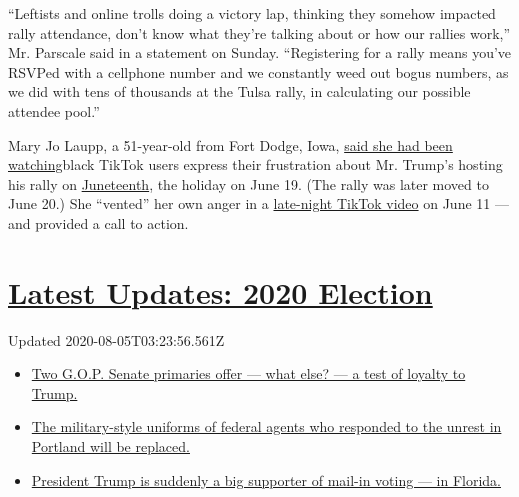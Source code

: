 ``Leftists and online trolls doing a victory lap, thinking they somehow
impacted rally attendance, don't know what they're talking about or how
our rallies work,'' Mr. Parscale said in a statement on Sunday.
``Registering for a rally means you've RSVPed with a cellphone number
and we constantly weed out bogus numbers, as we did with tens of
thousands at the Tulsa rally, in calculating our possible attendee
pool.''

Mary Jo Laupp, a 51-year-old from Fort Dodge, Iowa,
\href{https://www.dailydot.com/debug/tiktok-challenge-trump-rally/}{said
she had been watching}black TikTok users express their frustration about
Mr. Trump's hosting his rally on
\href{https://www.nytimes3xbfgragh.onion/interactive/2020/06/18/style/juneteenth-celebration.html}{Juneteenth},
the holiday on June 19. (The rally was later moved to June 20.) She
``vented'' her own anger in a
\href{https://www.tiktok.com/@maryjolaupp/video/6837311838640803078}{late-night
TikTok video} on June 11 --- and provided a call to action.

\hypertarget{latest-updates-2020-election}{%
\section{\texorpdfstring{\href{https://www.nytimes3xbfgragh.onion/2020/08/04/us/elections/primary-election-michigan-arizona-kansas.html?action=click\&pgtype=Article\&state=default\&region=MAIN_CONTENT_1\&context=storylines_live_updates}{Latest
Updates: 2020
Election}}{Latest Updates: 2020 Election}}\label{latest-updates-2020-election}}

Updated 2020-08-05T03:23:56.561Z

\begin{itemize}
\tightlist
\item
  \href{https://www.nytimes3xbfgragh.onion/2020/08/04/us/elections/primary-election-michigan-arizona-kansas.html?action=click\&pgtype=Article\&state=default\&region=MAIN_CONTENT_1\&context=storylines_live_updates\#link-3924dd44}{Two
  G.O.P. Senate primaries offer --- what else? --- a test of loyalty to
  Trump.}
\item
  \href{https://www.nytimes3xbfgragh.onion/2020/08/04/us/elections/primary-election-michigan-arizona-kansas.html?action=click\&pgtype=Article\&state=default\&region=MAIN_CONTENT_1\&context=storylines_live_updates\#link-62a8e06b}{The
  military-style uniforms of federal agents who responded to the unrest
  in Portland will be replaced.}
\item
  \href{https://www.nytimes3xbfgragh.onion/2020/08/04/us/elections/primary-election-michigan-arizona-kansas.html?action=click\&pgtype=Article\&state=default\&region=MAIN_CONTENT_1\&context=storylines_live_updates\#link-32b39e33}{President
  Trump is suddenly a big supporter of mail-in voting --- in Florida.}
\end{itemize}

